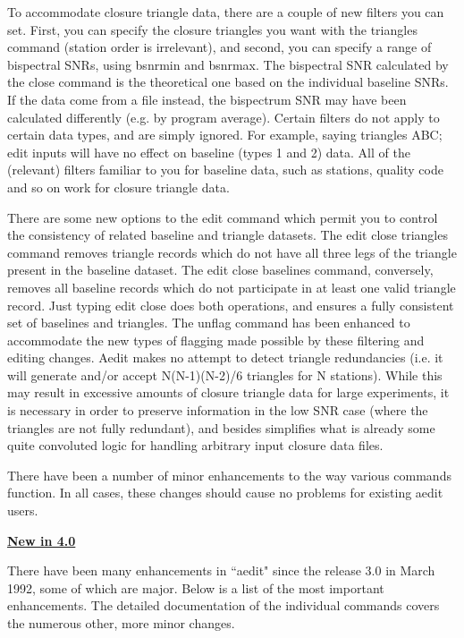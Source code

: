To accommodate closure triangle data, there are a couple of new filters you can 
set.  First, you can specify the closure triangles you want with the triangles 
command (station order is irrelevant), and second, you can specify a range of 
bispectral SNRs, using bsnrmin and bsnrmax.  The bispectral SNR calculated by 
the close command is the theoretical one based on the individual baseline SNRs.  
If the data come from a file instead, the bispectrum SNR may have been calculated 
differently (e.g. by program average).  Certain filters do not apply to certain data 
types, and are simply ignored.  For example, saying triangles ABC; edit inputs will 
have no effect on baseline (types 1 and 2) data.  All of the (relevant) filters 
familiar to you for baseline data, such as stations, quality code and so on work 
for closure triangle data.

There are some new options to the edit command which permit you to control the 
consistency of related baseline and triangle datasets.  The edit close triangles 
command removes triangle records which do not have all three legs of the triangle 
present in the baseline dataset.  The edit close baselines command, conversely, 
removes all baseline records which do not participate in at least one valid 
triangle record.  Just typing edit close does both operations, and ensures a 
fully consistent set of baselines and triangles.  The unflag command has been 
enhanced to accommodate the new types of flagging made possible by these filtering 
and editing changes.  Aedit makes no attempt to detect triangle redundancies 
(i.e. it will generate and/or accept N(N-1)(N-2)/6 triangles for N stations).  
While this may result in excessive amounts of closure triangle data for large 
experiments, it is necessary in order to preserve information in the low 
SNR case (where the triangles are not fully redundant), and besides simplifies 
what is already some quite convoluted logic for handling arbitrary input closure 
data files.

There have been a number of minor enhancements to the way various commands function.  
In all cases, these changes should cause no problems for existing aedit users.



\begin{center}
\large\bf
\underline{New in 4.0}
\end{center}

There have been many enhancements in ``aedit" since the release 3.0
in March 1992, some of which are major.  Below is a list of the most 
important enhancements.  The detailed documentation of the individual 
commands covers the numerous other, more minor changes.

